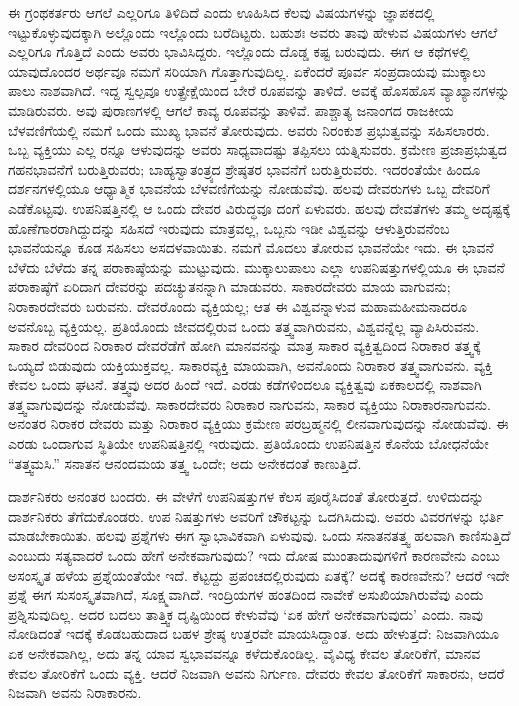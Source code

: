 ಈ ಗ್ರಂಥಕರ್ತರು ಆಗಲೆ ಎಲ್ಲರಿಗೂ ತಿಳಿದಿದೆ ಎಂದು ಊಹಿಸಿದ ಕೆಲವು ವಿಷಯಗಳನ್ನು ಜ್ಞಾಪಕದಲ್ಲಿ ಇಟ್ಟುಕೊಳ್ಳುವುದಕ್ಕಾಗಿ ಅಲ್ಲೊಂದು ಇಲ್ಲೊಂದು ಬರೆದಿಟ್ಟರು. ಬಹುಶಃ ಅವರು ತಾವು ಹೇಳುವ ವಿಷಯಗಳು ಆಗಲೆ ಎಲ್ಲರಿಗೂ ಗೊತ್ತಿದೆ ಎಂದು ಅವರು ಭಾವಿಸಿದ್ದರು. ಇಲ್ಲೊಂದು ದೊಡ್ಡ ಕಷ್ಟ ಬರುವುದು. ಈಗ ಆ ಕಥೆಗಳಲ್ಲಿ ಯಾವುದೊಂದರ ಅರ್ಥವೂ ನಮಗೆ ಸರಿಯಾಗಿ ಗೊತ್ತಾಗುವುದಿಲ್ಲ. ಏಕೆಂದರೆ ಪೂರ್ವ ಸಂಪ್ರದಾಯವು ಮುಕ್ಕಾಲು ಪಾಲು ನಾಶವಾಗಿದೆ. ಇದ್ದ ಸ್ವಲ್ಪವೂ ಉತ್ಪ್ರೇಕ್ಷೆಯಿಂದ ಬೇರೆ ರೂಪವನ್ನು ತಾಳಿದೆ. ಅವಕ್ಕೆ ಹೊಸಹೊಸ ವ್ಯಾಖ್ಯಾನಗಳನ್ನು ಮಾಡಿರುವರು. ಅವು ಪುರಾಣಗಳಲ್ಲಿ ಆಗಲೆ ಕಾವ್ಯ ರೂಪವನ್ನು ತಾಳಿವೆ. ಪಾಶ್ಚಾತ್ಯ ಜನಾಂಗದ ರಾಜಕೀಯ ಬೆಳವಣಿಗೆಯಲ್ಲಿ ನಮಗೆ ಒಂದು ಮುಖ್ಯ ಭಾವನೆ ತೋರುವುದು. ಅವರು ನಿರಂಕುಶ ಪ್ರಭುತ್ವವನ್ನು ಸಹಿಸಲಾರರು. ಒಬ್ಬ ವ್ಯಕ್ತಿಯು ಎಲ್ಲ ರನ್ನೂ ಆಳುವುದನ್ನು ಅವರು ಸಾಧ್ಯವಾದಷ್ಟು ತಪ್ಪಿಸಲು ಯತ್ನಿಸುವರು. ಕ್ರಮೇಣ ಪ್ರಜಾಪ್ರಭುತ್ವದ ಗಹನಭಾವನೆಗೆ ಬರುತ್ತಿರುವರು; ಬಾಹ್ಯಸ್ವಾತಂತ್ರ್ಯದ ಶ್ರೇಷ್ಠತರ ಭಾವನೆಗೆ ಬರುತ್ತಿರುವರು. ಇದರಂತೆಯೇ ಹಿಂದೂ ದರ್ಶನಗಳಲ್ಲಿಯೂ ಆಧ್ಯಾತ್ಮಿಕ ಭಾವನೆಯ ಬೆಳವಣಿಗೆಯನ್ನು ನೋಡುವೆವು. ಹಲವು ದೇವರುಗಳು ಒಬ್ಬ ದೇವರಿಗೆ ಎಡೆಕೊಟ್ಟವು. ಉಪನಿಷತ್ತಿನಲ್ಲಿ ಆ ಒಂದು ದೇವರ ವಿರುದ್ಧವೂ ದಂಗೆ ಏಳುವರು. ಹಲವು ದೇವತೆಗಳು ತಮ್ಮ ಅದೃಷ್ಟಕ್ಕೆ ಹೊಣೆಗಾರರಾಗಿದ್ದುದನ್ನು ಸಹಿಸದೆ ಇರುವುದು ಮಾತ್ರವಲ್ಲ, ಒಬ್ಬನು ಇಡೀ ವಿಶ್ವವನ್ನು ಆಳುತ್ತಿರುವನೆಂಬ ಭಾವನೆಯನ್ನೂ ಕೂಡ ಸಹಿಸಲು ಅಸದಳವಾಯಿತು. ನಮಗೆ ಮೊದಲು ತೋರುವ ಭಾವನೆಯೇ ಇದು. ಈ ಭಾವನೆ ಬೆಳೆದು ಬೆಳೆದು ತನ್ನ ಪರಾಕಾಷ್ಠೆಯನ್ನು ಮುಟ್ಟುವುದು. ಮುಕ್ಕಾಲುಪಾಲು ಎಲ್ಲಾ ಉಪನಿಷತ್ತುಗಳಲ್ಲಿಯೂ ಈ ಭಾವನೆ ಪರಾಕಾಷ್ಠೆಗೆ ಏರಿದಾಗ ದೇವರನ್ನು ಪದಚ್ಯುತನನ್ನಾಗಿ ಮಾಡುವರು. ಸಾಕಾರದೇವರು ಮಾಯ ವಾಗುವನು; ನಿರಾಕಾರದೇವರು ಬರುವನು. ದೇವರೊಂದು ವ್ಯಕ್ತಿಯಲ್ಲ; ಆತ ಈ ವಿಶ್ವವನ್ನಾಳುವ ಮಹಾಮಹೀಮನಾದರೂ ಅವನೊಬ್ಬ ವ್ಯಕ್ತಿಯಲ್ಲ. ಪ್ರತಿಯೊಂದು ಜೀವದಲ್ಲಿರುವ ಒಂದು ತತ್ತ್ವವಾಗಿರುವನು, ವಿಶ್ವವನ್ನೆಲ್ಲ ವ್ಯಾಪಿಸಿರುವನು. ಸಾಕಾರ ದೇವರಿಂದ ನಿರಾಕಾರ ದೇವರೆಡೆಗೆ ಹೋಗಿ ಮಾನವನನ್ನು ಮಾತ್ರ ಸಾಕಾರ ವ್ಯಕ್ತಿತ್ವದಿಂದ ನಿರಾಕಾರ ತತ್ತ್ವಕ್ಕೆ ಒಯ್ಯದೆ ಬಿಡುವುದು ಯಕ್ತಿಯುಕ್ತವಲ್ಲ. ಸಾಕಾರವ್ಯಕ್ತಿ ಮಾಯವಾಗಿ, ಅವನೊಂದು ನಿರಾಕಾರ ತತ್ತ್ವವಾಗುವನು. ವ್ಯಕ್ತಿ ಕೇವಲ ಒಂದು ಘಟನೆ. ತತ್ತ್ವವು ಅದರ ಹಿಂದೆ ಇದೆ. ಎರಡು ಕಡೆಗಳಿಂದಲೂ ವ್ಯಕ್ತಿತ್ವವು ಏಕಕಾಲದಲ್ಲಿ ನಾಶವಾಗಿ ತತ್ತ್ವವಾಗುವುದನ್ನು ನೋಡುವೆವು. ಸಾಕಾರದೇವರು ನಿರಾಕಾರ ನಾಗುವನು, ಸಾಕಾರ ವ್ಯಕ್ತಿಯು ನಿರಾಕಾರನಾಗುವನು. ಅನಂತರ ನಿರಾಕರ ದೇವರು ಮತ್ತು ನಿರಾಕಾರ ವ್ಯಕ್ತಿಯು ಕ್ರಮೇಣ ಪರಬ್ರಹ್ಮನಲ್ಲಿ ಲೀನವಾಗುವುದನ್ನು ನೋಡುವೆವು. ಈ ಎರಡು ಒಂದಾಗುವ ಸ್ಥಿತಿಯೇ ಉಪನಿಷತ್ತಿನಲ್ಲಿ ಇರುವುದು. ಪ್ರತಿಯೊಂದು ಉಪನಿಷತ್ತಿನ ಕೊನೆಯ ಬೋಧನೆಯೇ “ತತ್ತ್ವಮಸಿ.” ಸನಾತನ ಆನಂದಮಯ ತತ್ತ್ವ ಒಂದೇ; ಅದು ಅನೇಕದಂತೆ ಕಾಣುತ್ತಿದೆ.

ದಾರ್ಶನಿಕರು ಅನಂತರ ಬಂದರು. ಈ ವೇಳೆಗೆ ಉಪನಿಷತ್ತುಗಳ ಕೆಲಸ ಪೂರೈಸಿದಂತೆ ತೋರುತ್ತದೆ. ಉಳಿದುದನ್ನು ದಾರ್ಶನಿಕರು ತೆಗೆದುಕೊಂಡರು. ಉಪ ನಿಷತ್ತುಗಳು ಅವರಿಗೆ ಚೌಕಟ್ಟನ್ನು ಒದಗಿಸಿದುವು. ಅವರು ವಿವರಗಳನ್ನು ಭರ್ತಿ ಮಾಡಬೇಕಾಯಿತು. ಹಲವು ಪ್ರಶ್ನೆಗಳು ಈಗ ಸ್ವಾಭಾವಿಕವಾಗಿ ಏಳುವುವು. ಒಂದು ಸನಾತನತತ್ತ್ವ ಹಲವಾಗಿ ಕಾಣಿಸುತ್ತಿದೆ ಎಂಬುದು ಸತ್ಯವಾದರೆ ಒಂದು ಹೇಗೆ ಅನೇಕವಾಗುವುದು? ಇದು ದೋಷ ಮುಂತಾದುವುಗಳಿಗೆ ಕಾರಣವೇನು ಎಂಬು ಅಸಂಸ್ಕೃತ ಹಳೆಯ ಪ್ರಶ್ನೆಯಂತೆಯೇ ಇದೆ. ಕೆಟ್ಟದ್ದು ಪ್ರಪಂಚದಲ್ಲಿರುವುದು ಏತಕ್ಕೆ? ಅದಕ್ಕೆ ಕಾರಣವೇನು? ಆದರೆ ಇದೇ ಪ್ರಶ್ನೆ ಈಗ ಸುಸಂಸ್ಕೃತವಾಗಿದೆ, ಸೂಕ್ಷ್ಮವಾಗಿದೆ. ಇಂದ್ರಿಯಗಳ ಹಂತದಿಂದ ನಾವೇಕೆ ಅಸುಖಿಯಾಗಿರುವೆವು ಎಂದು ಪ್ರಶ್ನಿಸುವುದಿಲ್ಲ. ಅದರ ಬದಲು ತಾತ್ತ್ವಿಕ ದೃಷ್ಟಿಯಿಂದ ಕೇಳುವೆವು ‘ಏಕ ಹೇಗೆ ಅನೇಕವಾಗುವುದು’ ಎಂದು. ನಾವು ನೋಡಿದಂತೆ ಇದಕ್ಕೆ ಕೊಡಬಹುದಾದ ಬಹಳ ಶ್ರೇಷ್ಠ ಉತ್ತರವೇ ಮಾಯಸಿದ್ದಾಂತ. ಅದು ಹೇಳುತ್ತದೆ: ನಿಜವಾಗಿಯೂ ಏಕ ಅನೇಕವಾಗಿಲ್ಲ, ಅದು ತನ್ನ ಯಾವ ಸ್ವಭಾವವನ್ನೂ ಕಳೆದುಕೊಂಡಿಲ್ಲ. ವೈವಿಧ್ಯ ಕೇವಲ ತೋರಿಕೆಗೆ, ಮಾನವ ಕೇವಲ ತೋರಿಕೆಗೆ ಒಂದು ವ್ಯಕ್ತಿ. ಆದರೆ ನಿಜವಾಗಿ ಅವನು ನಿರ್ಗುಣ. ದೇವರು ಕೇವಲ ತೋರಿಕೆಗೆ ಸಾಕಾರನು, ಆದರೆ ನಿಜವಾಗಿ ಅವನು ನಿರಾಕಾರನು.

